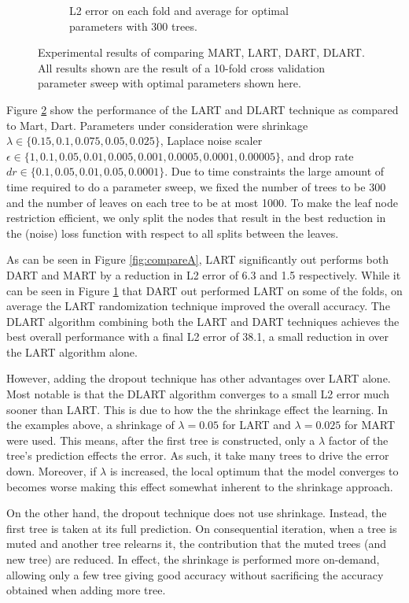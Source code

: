 \documentclass{article} %
\begin{document}
\begin{figure}
\begin{subfigure}{.49\textwidth}
\caption{L2 error on each fold and average for optimal parameters with 300 trees.\label{fig:compareB}}
\end{subfigure}
\caption{Experimental results of comparing MART, LART, DART, DLART. All results shown are the result of a 10-fold cross validation parameter sweep with optimal parameters shown here.  \label{fig:compare}}


\end{figure}

Figure \ref{fig:compare} show the performance of the LART and DLART technique as compared to Mart, Dart. Parameters under consideration were shrinkage $\lambda\in\{0.15, 0.1,0.075, 0.05, 0.025 \}$, Laplace noise scaler $\epsilon\in \{ 1, 0.1,0.05, 0.01, 0.005, 0.001 ,0.0005,0.0001, 0.00005\}$, and drop rate  $dr\in \{0.1, 0.05, 0.01, 0.05, 0.0001\}$. Due to time constraints the large amount of time required to do a parameter sweep, we fixed  the number of trees to be 300 and the number of leaves on each tree to be at most 1000. To make the leaf node restriction efficient, we only split the nodes that result in the best reduction in the (noise) loss function with respect to all splits between the leaves.

As can be seen in Figure \ref{fig:compareA}, LART significantly out performs both DART and MART by a reduction in L2 error of  6.3 and 1.5 respectively. While it can be seen in Figure \ref{fig:compareB} that DART out performed LART on some of the folds, on average the LART randomization technique improved the overall accuracy. The DLART algorithm  combining both the LART and DART techniques achieves the best overall performance with a final L2 error of 38.1, a small reduction in over the LART algorithm alone. 

However, adding the dropout technique has other advantages over LART alone. Most notable is that the DLART algorithm converges to a small L2 error much sooner than LART. This is due to how the the shrinkage effect the learning. In the examples above, a shrinkage of $\lambda=0.05$ for LART and $\lambda=0.025$ for MART were used. This means, after the first tree is constructed, only a $\lambda$ factor of the tree's prediction effects the error. As such, it take many trees to drive the error down. Moreover, if $\lambda$ is increased, the local optimum that the model converges to becomes worse making this effect somewhat inherent to the shrinkage approach. 

On the other hand, the dropout technique does not use shrinkage. Instead, the first tree is taken at its full prediction. On consequential iteration, when a tree is muted and another tree relearns it, the contribution that the muted trees (and new tree) are reduced. In effect, the shrinkage is performed more on-demand, allowing only a few tree giving good accuracy without sacrificing the accuracy obtained when adding more tree. 
\end{document}
